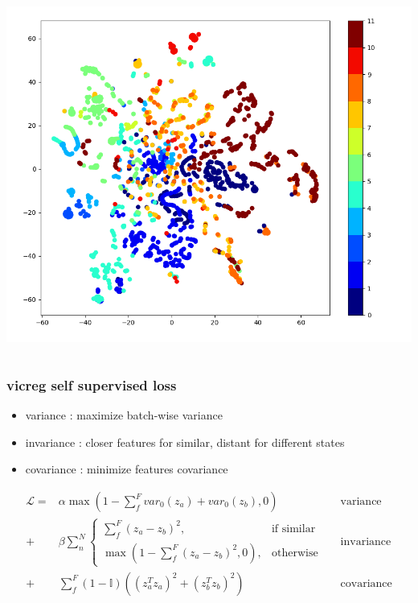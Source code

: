 \documentclass{beamer}
\begin{document}
\begin{frame}
\begin{columns}
    \begin{column}{0.5\textwidth}
      \centering
      \includegraphics[scale=0.2]{../images/snd_features.png}
    \end{column}
  
  \end{columns}

\end{frame}



\begin{frame}
  
  \frametitle{vicreg self supervised loss}

  \begin{itemize}
    \item variance   : maximize batch-wise variance
    \item invariance : closer features for similar, distant for different states
    \item covariance : minimize features covariance
  \end{itemize}
 
  \begin{align*}
    \mathcal{L} = &\alpha \max \left( 1 - \sum_{f}^{F} var_{0}(z_a) + var_{0}(z_b), 0 \right) &&  \text{variance} \\
                  + &\beta  \sum_{n}^{N}  \begin{cases}
                                            \sum_{f}^{F} (z_a - z_b)^2,& \text{if similar}\\
                                            \max(1 - \sum_{f}^{F} (z_a - z_b)^2, 0), & \text{otherwise}
                                          \end{cases} &&  \text{invariance} \\
                  + &\sum_{f}^{F}(1 - \mathbb{I})\left( (z_a^Tz_a)^2 + (z_b^Tz_b)^2 \right) && \text{covariance}
  \end{align*}  
 
\end{frame}
\end{document}
